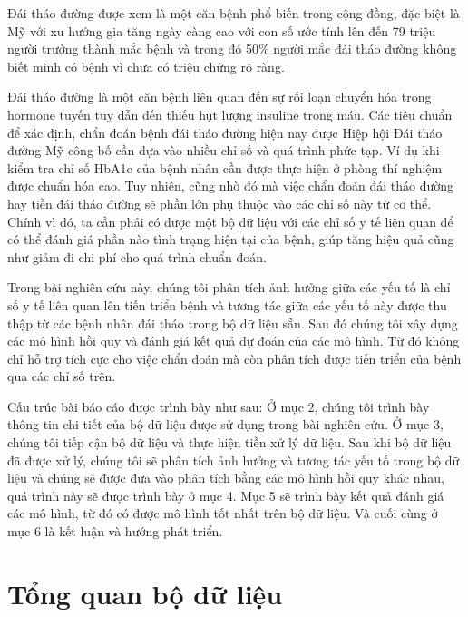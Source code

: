 \documentclass[runningheads]{llncs}
\begin{document}
Đái tháo đường được xem là một căn bệnh phổ biến trong cộng đồng, đặc biệt là Mỹ với xu hướng gia tăng ngày càng cao với con số ước tính lên đến 79 triệu người trưởng thành mắc bệnh và trong đó 50\% người mắc đái tháo đường không biết mình có bệnh vì chưa có triệu chứng rõ ràng. 

Đái tháo đường là một căn bệnh liên quan đến sự rối loạn chuyển hóa trong hormone tuyến tuỵ dẫn đến thiếu hụt lượng insuline trong máu. Các tiêu chuẩn để xác định, chẩn đoán bệnh đái tháo đường hiện nay được Hiệp hội Đái tháo đường Mỹ công bố cần dựa vào nhiều chỉ số và quá trình phức tạp. Ví dụ khi kiểm tra chỉ số HbA1c của bệnh nhân cần được thực hiện ở phòng thí nghiệm được chuẩn hóa cao. Tuy nhiên, cũng nhờ đó mà việc chẩn đoán đái tháo đường hay tiền đái tháo đường sẽ phần lớn phụ thuộc vào các chỉ số này từ cơ thể. 
Chính vì đó, ta cần phải có được một bộ dữ liệu với các chỉ số y tế liên quan để có thể đánh giá phần nào tình trạng hiện tại của bệnh, giúp tăng hiệu quả cũng như giảm đi chi phí cho quá trình chuẩn đoán. 

Trong bài nghiên cứu này, chúng tôi phân tích ảnh hưởng giữa các yếu tố là chỉ số y tế liên quan lên tiến triển bệnh và tương tác giữa các yếu tố này được thu thập từ các bệnh nhân đái tháo trong bộ dữ liệu sẵn. Sau đó chúng tôi xây dựng các mô hình hồi quy và đánh giá kết quả dự đoán của các mô hình. Từ đó không chỉ hỗ trợ tích cực cho việc chẩn đoán mà còn phân tích được tiến triển của bệnh qua các chỉ số trên.

Cấu trúc bài báo cáo được trình bày như sau: Ở mục 2, chúng tôi trình bày thông tin chi tiết của bộ dữ liệu được sử dụng trong bài nghiên cứu. Ở mục 3, chúng tôi tiếp cận bộ dữ liệu và thực hiện tiền xử lý dữ liệu. Sau khi bộ dữ liệu đã được xử lý, chúng tôi sẽ phân tích ảnh hưởng và tương tác yếu tố trong bộ dữ liệu và chúng sẽ được đưa vào phân tích bằng các mô hình hồi quy khác nhau, quá trình này sẽ được trình bày ở mục 4. Mục 5 sẽ trình bày kết quả đánh giá các mô hình, từ đó có được mô hình tốt nhất trên bộ dữ liệu. Và cuối cùng ở mục 6 là kết luận và hướng phát triển.

\section{Tổng quan bộ dữ liệu}
\end{document}
